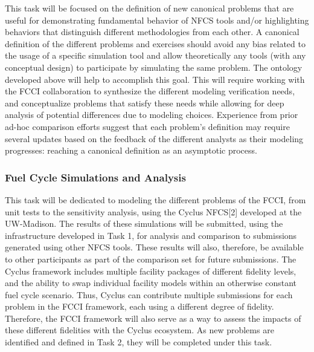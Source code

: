 This task will be focused on the definition of new canonical problems that are
useful for demonstrating fundamental behavior of NFCS tools and/or highlighting
behaviors that distinguish different methodologies from each other.  A canonical
definition of the different problems and exercises should avoid any bias related
to the usage of a specific simulation tool and allow theoretically any tools
(with any conceptual design) to participate by simulating the same problem.  The
ontology developed above will help to accomplish this goal.  This will require
working with the FCCI collaboration to synthesize the different modeling
verification needs, and conceptualize problems that satisfy these needs while
allowing for deep analysis of potential differences due to modeling choices.
Experience from prior ad-hoc comparison efforts suggest that each problem’s
definition may require several updates based on the feedback of the different
analysts as their modeling progresses: reaching a canonical definition as an
asymptotic process. 


\subsubsection{Fuel Cycle Simulations and Analysis} 

This task will be dedicated to modeling the different problems of the FCCI, from
unit tests to the sensitivity analysis, using the Cyclus NFCS[2] developed at
the UW-Madison. The results of these simulations will be submitted, using the
infrastructure developed in Task 1, for analysis and comparison to submissions
generated using other NFCS tools.  These results will also, therefore, be
available to other participants as part of the comparison set for future
submissions.  The Cyclus framework includes multiple facility packages of
different fidelity levels, and the ability to swap individual facility models
within an otherwise constant fuel cycle scenario.  Thus, Cyclus can contribute
multiple submissions for each problem in the FCCI framework, each using a
different degree of fidelity.  Therefore, the FCCI framework will also serve as
a way to assess the impacts of these different fidelities with the Cyclus
ecosystem.  As new problems are identified and defined in Task 2, they will be
completed under this task.
